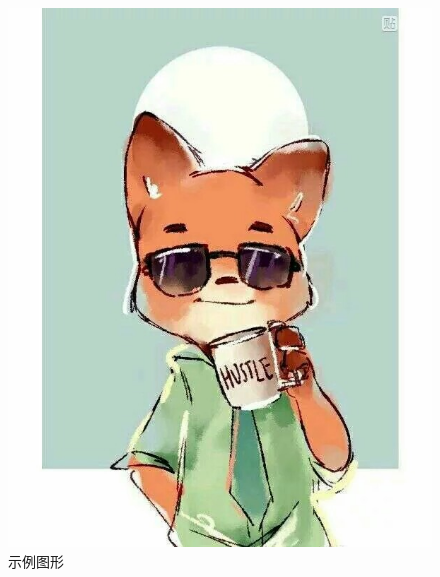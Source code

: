 \documentclass{HNUThesis}
\begin{document}
    
    \begin{figure}[htbp]
        \centering %
        \includegraphics[width=0.8\linewidth]{figures/nick.jpeg} %
        \caption{示例图形} %
        \label{fig:example} %
        \end{figure}

    
    
\end{document}
